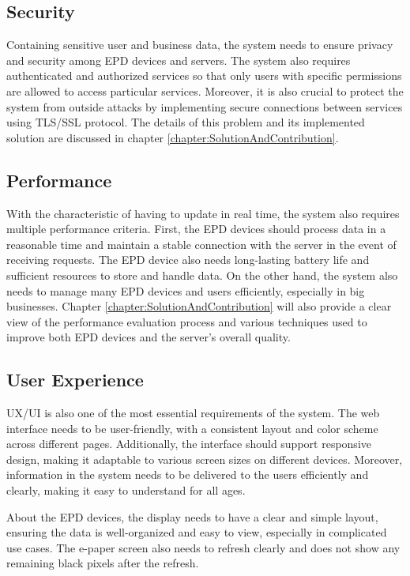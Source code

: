 \documentclass[../Main.tex]{subfiles}
\begin{document}
\subsection{Security}
Containing sensitive user and business data, the system needs to ensure privacy and security among \gls{EPD} devices and servers. The system also requires authenticated and authorized services so that only users with specific permissions are allowed to access particular services. Moreover, it is also crucial to protect the system from outside attacks by implementing secure connections between services using TLS/SSL protocol. The details of this problem and its implemented solution are discussed in chapter \ref{chapter:SolutionAndContribution}.

\subsection{Performance}
With the characteristic of having to update in real time, the system also requires multiple performance criteria. First, the \gls{EPD} devices should process data in a reasonable time and maintain a stable connection with the server in the event of receiving requests. The \gls{EPD} device also needs long-lasting battery life and sufficient resources to store and handle data.  On the other hand, the system also needs to manage many \gls{EPD} devices and users efficiently, especially in big businesses. Chapter \ref{chapter:SolutionAndContribution} will also provide a clear view of the performance evaluation process and various techniques used to improve both \gls{EPD} devices and the server's overall quality.

\subsection{User Experience}
UX/UI is also one of the most essential requirements of the system. The web interface needs to be user-friendly, with a consistent layout and color scheme across different pages. Additionally, the interface should support responsive design, making it adaptable to various screen sizes on different devices. Moreover, information in the system needs to be delivered to the users efficiently and clearly, making it easy to understand for all ages.

About the \gls{EPD} devices, the display needs to have a clear and simple layout, ensuring the data is well-organized and easy to view, especially in complicated use cases. The e-paper screen also needs to refresh clearly and does not show any remaining black pixels after the refresh.
\end{document}

